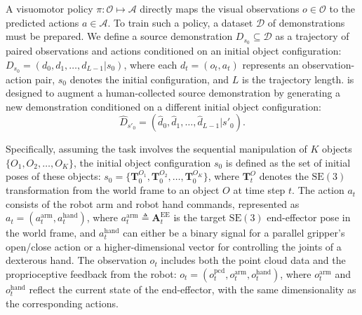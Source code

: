 A visuomotor policy $\pi: \mathcal{O} \mapsto \mathcal{A}$ directly maps the visual observations $o \in \mathcal{O}$ to the predicted actions $a \in \mathcal{A}$. To train such a policy, a dataset $\mathcal{D}$ of demonstrations must be prepared. We define a source demonstration $D_{s_0} \subseteq \mathcal{D}$ as a trajectory of paired observations and actions conditioned on an initial object configuration: $D_{s_0} = (d_0, d_1, \dots, d_{L-1} | s_0)$, where each $d_t = (o_t, a_t)$ represents an observation-action pair, $s_0$ denotes the initial configuration, and $L$ is the trajectory length. 
\method is designed to augment a human-collected source demonstration by generating a new demonstration conditioned on a different initial object configuration:
\begin{equation*}
    \hat{D}_{s'_0} = (\hat{d}_0, \hat{d}_1, \dots, \hat{d}_{L-1} | s'_0).
\end{equation*}


Specifically, assuming the task involves the sequential manipulation of $K$ objects $\{O_1, O_2, \dots, O_K\}$, the initial object configuration $s_0$ is defined as the set of initial poses of these objects: $s_0 = \{\mathbf{T}_0^{O_1}, \mathbf{T}_0^{O_2}, \dots, \mathbf{T}_0^{O_K}\}$, where $\mathbf{T}^O_t$ denotes the $\mathrm{SE(3)}$ transformation from the world frame to an object $O$ at time step $t$.
The action $a_t$ consists of the robot arm and robot hand commands, represented as $a_t = (a_t^{\mathrm{arm}}, a_t^{\mathrm{hand}})$, where $a_t^{\mathrm{arm}}\triangleq \mathbf{A}^{\mathrm{EE}}_t$ is the target $\mathrm{SE(3)}$ end-effector pose in the world frame, and $a_t^{\mathrm{hand}}$ can either be a binary signal for a parallel gripper’s open/close action or a higher-dimensional vector for controlling the joints of a dexterous hand. The observation $o_t$ includes both the point cloud data and the proprioceptive feedback from the robot: $o_t = (o^{\mathrm{pcd}}_t, o^{\mathrm{arm}}_t, o^{\mathrm{hand}}_t)$, where $o^{\mathrm{arm}}_t$ and $o^{\mathrm{hand}}_t$ reflect the current state of the end-effector, with the same dimensionality as the corresponding actions.






